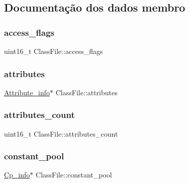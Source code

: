 \subsection{Documentação dos dados membro}
\hypertarget{struct_class_file_a2d095ef980330834af44c587ce52590e}{}\label{struct_class_file_a2d095ef980330834af44c587ce52590e} 
\subsubsection{\texorpdfstring{access\+\_\+flags}{access\_flags}}
{\footnotesize\ttfamily uint16\+\_\+t Class\+File\+::access\+\_\+flags}

\hypertarget{struct_class_file_a20d4b18030becbd8df5b7584477e94b6}{}\label{struct_class_file_a20d4b18030becbd8df5b7584477e94b6} 
\subsubsection{\texorpdfstring{attributes}{attributes}}
{\footnotesize\ttfamily \hyperlink{struct_attribute__info}{Attribute\+\_\+info}$\ast$ Class\+File\+::attributes}

\hypertarget{struct_class_file_accd99ee441c45eb8fdcd3836d56e9ef4}{}\label{struct_class_file_accd99ee441c45eb8fdcd3836d56e9ef4} 
\subsubsection{\texorpdfstring{attributes\+\_\+count}{attributes\_count}}
{\footnotesize\ttfamily uint16\+\_\+t Class\+File\+::attributes\+\_\+count}

\hypertarget{struct_class_file_a79a3f2798c8da988fd7347db3c095d44}{}\label{struct_class_file_a79a3f2798c8da988fd7347db3c095d44} 
\subsubsection{\texorpdfstring{constant\+\_\+pool}{constant\_pool}}
{\footnotesize\ttfamily \hyperlink{struct_cp__info}{Cp\+\_\+info}$\ast$ Class\+File\+::constant\+\_\+pool}

